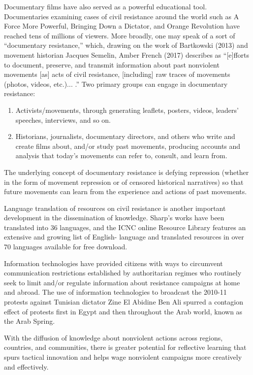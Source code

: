 \documentclass[twoside,a4paper,12pt,fleqn,openany]{extbook}
\begin{document}
Documentary films have also served as a powerful educational tool. Documentaries examining cases of civil resistance around the world such as A Force More Powerful, Bringing Down a Dictator, and Orange Revolution have reached tens of millions of viewers. More broadly, one may speak of a sort of “documentary resistance,” which, drawing on the work of Bartkowski (2013) and movement historian Jacques Semelin, Amber French (2017) describes as “[e]fforts to document, preserve, and transmit information about past nonviolent movements [as] acts of civil resistance, [including] raw traces of movements (photos, videos, etc.)... .” Two primary groups can engage in documentary resistance:

\begin{enumerate}
\item Activists/movements, through generating leaflets, posters, videos, leaders’ speeches, interviews, and so on.
\item Historians, journalists, documentary directors, and others who write and create films about, and/or study past movements, producing accounts and analysis that today’s movements can refer to, consult, and learn from.
\end{enumerate}

The underlying concept of documentary resistance is defying repression (whether in the form of movement repression or of censored historical narratives) so that future movements can learn from the experience and actions of past movements.

Language translation of resources on civil resistance is another important development in the dissemination of knowledge. Sharp’s works have been translated into 36 languages, and the ICNC online Resource Library features an extensive and growing list of English-
language and translated resources in over 70 languages available for free download.

Information technologies have provided citizens with ways to circumvent communication restrictions established by authoritarian regimes who routinely seek to limit and/or regulate information about resistance campaigns at home and abroad. The use of information technologies to broadcast the 2010-11 protests against Tunisian dictator Zine El Abidine Ben Ali spurred a contagion effect of protests first in Egypt and then throughout the Arab world, known as the Arab Spring.

With the diffusion of knowledge about nonviolent actions across regions, countries, and communities, there is greater potential for reflective learning that spurs tactical innovation and helps wage nonviolent campaigns more creatively and effectively.
\end{document}
